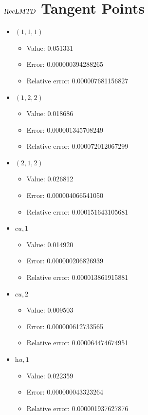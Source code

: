 \documentclass{article}%
\begin{document}
\section{$\textsl{RecLMTD}$ Tangent Points}%
\thispagestyle{plain}%
\begin{itemize}%
	\item $(1, 1, 1)$%
	\begin{itemize}%
		\item Value: 0.051331%
		\item Error: 0.000000394288265%
		\item Relative error: 0.000007681156827%
	\end{itemize}%
	\item $(1, 2, 2)$%
	\begin{itemize}%
		\item Value: 0.018686%
		\item Error: 0.000001345708249%
		\item Relative error: 0.000072012067299%
	\end{itemize}%
	\item $(2, 1, 2)$%
	\begin{itemize}%
		\item Value: 0.026812%
		\item Error: 0.000004066541050%
		\item Relative error: 0.000151643105681%
	\end{itemize}%
	\item $\textit{cu},1$%
	\begin{itemize}%
		\item Value: 0.014920%
		\item Error: 0.000000206826939%
		\item Relative error: 0.000013861915881%
	\end{itemize}%
	\item $\textit{cu},2$%
	\begin{itemize}%
		\item Value: 0.009503%
		\item Error: 0.000000612733565%
		\item Relative error: 0.000064474674951%
	\end{itemize}%
	\item $\textit{hu},1$%
	\begin{itemize}%
		\item Value: 0.022359%
		\item Error: 0.000000043323264%
		\item Relative error: 0.000001937627876%
	\end{itemize}%
\end{itemize}%
\end{document}
